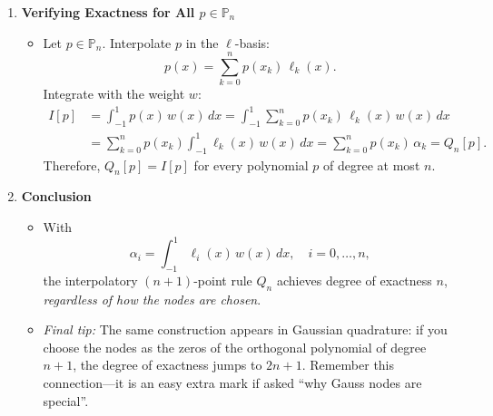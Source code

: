 \documentclass[a4paper,10pt]{article}
\begin{document}
\begin{enumerate}[label=\textbf{\arabic*.}, leftmargin=*, itemsep=1em]
\begin{enumerate}
        \item \textbf{Verifying Exactness for All \(p \in \mathbb{P}_n\)}
        \begin{itemize}
            \item Let \(p \in \mathbb{P}_n\). Interpolate \(p\) in the \(\ell\)-basis:
            \[
            p(x) = \sum_{k=0}^{n} p(x_k)\, \ell_k(x).
            \]
            Integrate with the weight \(w\):
            \begin{align*}
            I[p]
                &= \int_{-1}^{1} p(x)\, w(x)\, dx
                 = \int_{-1}^{1} \sum_{k=0}^{n} p(x_k)\, \ell_k(x)\, w(x)\, dx \\
                &= \sum_{k=0}^{n} p(x_k) \int_{-1}^{1} \ell_k(x)\, w(x)\, dx
                 = \sum_{k=0}^{n} p(x_k)\, \alpha_k
                 = Q_n[p].
            \end{align*}
            Therefore, \(Q_n[p] = I[p]\) for every polynomial \(p\) of degree at most \(n\).
        \end{itemize}

        \item \textbf{Conclusion}
        \begin{itemize}
            \item With
            \[
            \alpha_i = \int_{-1}^{1} \ell_i(x)\, w(x)\, dx,
            \quad i = 0, \dots, n,
            \]
            the interpolatory \((n+1)\)-point rule \(Q_n\) achieves degree of exactness \(n\), \emph{regardless of how the nodes are chosen}.
            \item \emph{Final tip:} The same construction appears in Gaussian quadrature: if you choose the nodes as the zeros of the orthogonal polynomial of degree \(n+1\), the degree of exactness jumps to \(2n+1\). Remember this connection—it is an easy extra mark if asked ``why Gauss nodes are special''.
        \end{itemize}
    \end{enumerate}
\end{enumerate}
\end{document}
